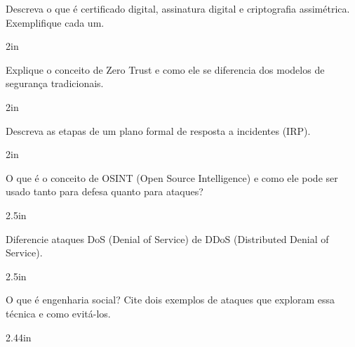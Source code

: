 \documentclass[12pt]{exam}
\begin{document}
	\begin{questions}
	\question Descreva o que é certificado digital, assinatura digital e criptografia assimétrica. Exemplifique cada um.
\begin{solutionbox}{2in}
\end{solutionbox}

\question Explique o conceito de Zero Trust e como ele se diferencia dos modelos de segurança tradicionais.
\begin{solutionbox}{2in}
\end{solutionbox}

\question Descreva as etapas de um plano formal de resposta a incidentes (IRP).
\begin{solutionbox}{2in}
\end{solutionbox}

\question O que é o conceito de OSINT (Open Source Intelligence) e como ele pode ser usado tanto para defesa quanto para ataques?
\begin{solutionbox}{2.5in}
\end{solutionbox}

\question Diferencie ataques DoS (Denial of Service) de DDoS (Distributed Denial of Service).
\begin{solutionbox}{2.5in}
\end{solutionbox}

\question O que é engenharia social? Cite dois exemplos de ataques que exploram essa técnica e como evitá-los.
\begin{solutionbox}{2.44in}
\end{solutionbox}

%
	

	\end{questions}
	
\end{document}

